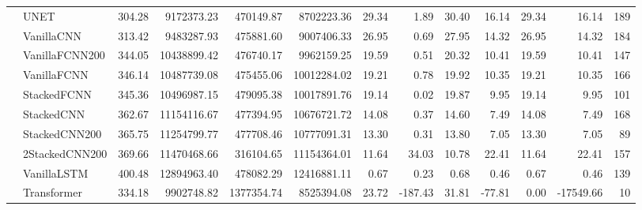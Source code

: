 \begin{tabular}{llrrrrrrrrrrr}
 & UNET & 304.28 & 9172373.23 & 470149.87 & 8702223.36 & 29.34 & 1.89 & 30.40 & 16.14 & 29.34 & 16.14 & 189 \\
 & VanillaCNN & 313.42 & 9483287.93 & 475881.60 & 9007406.33 & 26.95 & 0.69 & 27.95 & 14.32 & 26.95 & 14.32 & 184 \\
 & VanillaFCNN200 & 344.05 & 10438899.42 & 476740.17 & 9962159.25 & 19.59 & 0.51 & 20.32 & 10.41 & 19.59 & 10.41 & 147 \\
 & VanillaFCNN & 346.14 & 10487739.08 & 475455.06 & 10012284.02 & 19.21 & 0.78 & 19.92 & 10.35 & 19.21 & 10.35 & 166 \\
 & StackedFCNN & 345.36 & 10496987.15 & 479095.38 & 10017891.76 & 19.14 & 0.02 & 19.87 & 9.95 & 19.14 & 9.95 & 101 \\
 & StackedCNN & 362.67 & 11154116.67 & 477394.95 & 10676721.72 & 14.08 & 0.37 & 14.60 & 7.49 & 14.08 & 7.49 & 168 \\
 & StackedCNN200 & 365.75 & 11254799.77 & 477708.46 & 10777091.31 & 13.30 & 0.31 & 13.80 & 7.05 & 13.30 & 7.05 & 89 \\
 & 2StackedCNN200 & 369.66 & 11470468.66 & 316104.65 & 11154364.01 & 11.64 & 34.03 & 10.78 & 22.41 & 11.64 & 22.41 & 157 \\
 & VanillaLSTM & 400.48 & 12894963.40 & 478082.29 & 12416881.11 & 0.67 & 0.23 & 0.68 & 0.46 & 0.67 & 0.46 & 139 \\
 & Transformer & 334.18 & 9902748.82 & 1377354.74 & 8525394.08 & 23.72 & -187.43 & 31.81 & -77.81 & 0.00 & -17549.66 & 10 \\
\cline{1-13}
\bottomrule
\end{tabular}
